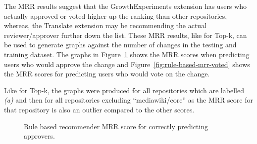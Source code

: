 The MRR results suggest that the GrowthExperiments extension has users who actually approved or voted higher up the ranking than other repositories, whereas, the Translate extension may be recommending the actual reviewer/approver further down the list. These MRR results, like for Top-k, can be used to generate graphs against the number of changes in the testing and training dataset. The graphs in Figure~\ref{fig:rule-based-mrr-approved} shows the MRR scores when predicting users who would approve the change and Figure~\ref{fig:rule-based-mrr-voted} shows the MRR scores for predicting users who would vote on the change.


Like for Top-k, the graphs were produced for all repositories which are labelled \emph{(a)} and then for all repositories excluding ``mediawiki/core'' as the MRR score for that repository is also an outlier compared to the other scores.

\begin{figure}[H]%
    \centering
    \caption{Rule based recommender MRR score for correctly predicting approvers.}%
    \label{fig:rule-based-mrr-approved}%
\end{figure}

